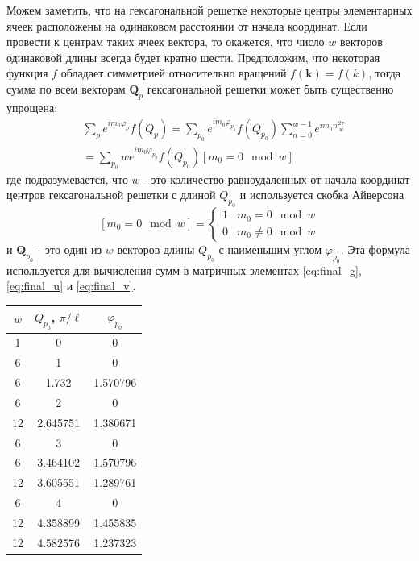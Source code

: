 \documentclass[a4paper,article,14pt]{extarticle}
\begin{document}
Можем заметить, что на гексагональной решетке некоторые центры элементарных ячеек расположены на одинаковом расстоянии от начала координат. Если провести к центрам таких ячеек вектора, то окажется, что число $w$ векторов одинаковой длины всегда будет кратно шести. Предположим, что некоторая функция $f$ обладает симметрией относительно вращений $f(\mathbf{k})=f(k)$, тогда сумма по всем векторам $\mathbf{Q}_p$ гексагональной решетки может быть существенно упрощена:
\begin{equation}
\label{eq:sum_qp}
\begin{aligned}
&\sum\limits_{p} e^{i m_0\varphi_p}   f(Q_p)  = \sum\limits_{p_0} e^{im_0\varphi_{{p_0}}} f(Q_{p_0})   \sum\limits_{n=0}^{w-1} e^{i m_0 n \frac{2 \pi}{w}} \\
  &=\sum\limits_{p_0} w e^{i m_0\varphi_{p_0}} f(Q_{p_0}) \left[m_0 = 0 \mod w  \right] 
\end{aligned}
\end{equation}
где подразумевается, что $w$ - это количество равноудаленных от начала координат центров гексагональной решетки с длиной $Q_{p_0}$ и используется скобка Айверсона
$$
\left[m_0 = 0 \mod w  \right] =   
\begin{cases}
   1 & m_0 = 0 \mod w \\
   0 & m_0 \neq 0 \mod w 
 \end{cases}
$$
и $\mathbf{Q}_{p_0}$ - это один из $w$ векторов длины $Q_{p_0}$ с наименьшим углом $\varphi_{p_0}$.
Эта формула используется для вычисления сумм в матричных элементах \eqref{eq:final_g}, \eqref{eq:final_u} и \eqref{eq:final_v}.

\begin{center}
\begin{tabular}{ |c|c|c| }
 \hline
 $w$  & $Q_{p_0}$, $\pi / \ell$ & $\varphi_{p_0}$\\ 
 \hline
 1&0&0\\
 6&1&0\\
 6&1.732&1.570796\\
 6&2&0\\
 12&2.645751&1.380671\\
 6&3&0\\
 6&3.464102&1.570796\\
 12&3.605551&1.289761\\
 6&4&0\\
 12&4.358899&1.455835\\
 12&4.582576&1.237323\\
 \hline
\end{tabular}
\end{center}
\end{document}
